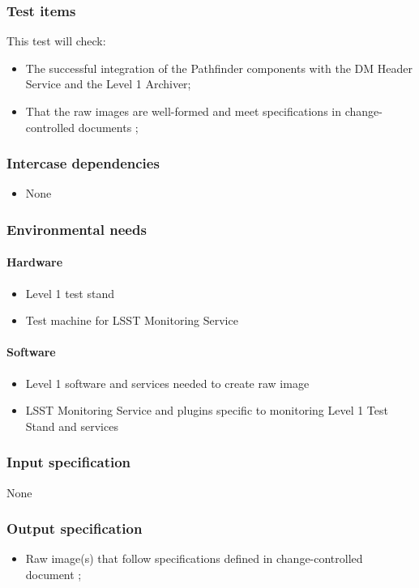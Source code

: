 \documentclass[DM,lsstdraft,STS,toc]{lsstdoc}
\begin{document}
\subsubsection{Test items}
This test will check:


\begin{itemize}
\item{The successful integration of the Pathfinder components with the DM Header Service and the Level 1 Archiver;}
\item{That the raw images are well-formed and meet specifications in change-controlled documents ;}
\end{itemize}


\subsubsection{Intercase dependencies}
\begin{itemize}
\item{None}
\end{itemize}


\subsubsection{Environmental needs}
\paragraph{Hardware}
\begin{itemize}
\item{Level 1 test stand}
\item{Test machine for LSST Monitoring Service}
\end{itemize}


\paragraph{Software}
\begin{itemize}
\item{Level 1 software and services needed to create raw image}
\item{LSST Monitoring Service and plugins specific to monitoring Level 1 Test Stand and services}
\end{itemize}


\subsubsection{Input specification}
None
\subsubsection{Output specification}
\begin{itemize}
\item{Raw image(s) that follow specifications defined in change-controlled document ;}
\end{itemize}
\end{document}
